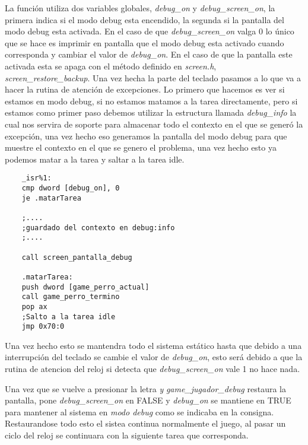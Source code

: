 La función utiliza dos variables globales, \textit{debug\_on} y \textit{debug\_screen\_on}, la primera indica si el modo debug esta encendido, la segunda si la pantalla del modo debug esta activada. En el caso de que \textit{debug\_screen\_on} valga 0 lo único que se hace es imprimir en pantalla que el modo debug esta activado cuando corresponda y cambiar el valor de \textit{debug\_on}. En el caso de que la pantalla este activada esta se apaga con el método definido en \textit{screen.h}, \textit{screen\_restore\_backup}. Una vez hecha la parte del teclado pasamos a lo que va a hacer la rutina de atención de excepciones. Lo primero que hacemos es ver si estamos en modo debug, si no estamos matamos a la tarea directamente, pero si estamos como primer paso debemos utilizar la estructura llamada \textit{debug\_info} la cual nos servira de soporte para almacenar todo el contexto en el que se generó la excepción, una vez hecho eso generamos la pantalla del modo debug para que muestre el contexto en el que se genero el problema, una vez hecho esto ya podemos matar a la tarea y saltar a la tarea idle.

\begin{lstlisting}
	_isr%1:
	cmp dword [debug_on], 0
	je .matarTarea
		
	;....
	;guardado del contexto en debug:info	
	;....	

	call screen_pantalla_debug

	.matarTarea:
	push dword [game_perro_actual]
	call game_perro_termino
	pop ax
	;Salto a la tarea idle
	jmp 0x70:0

\end{lstlisting}

Una vez hecho esto se mantendra todo el sistema estático hasta que debido a una interrupción del teclado se cambie el valor de \textit{debug\_on}, esto será debido a que la rutina de atencion del reloj si detecta que \textit{debug\_screen\_on} vale 1 no hace nada.

Una vez que se vuelve a presionar la letra \textit{y} \textit{game\_jugador\_debug} restaura la pantalla, pone \textit{debug\_screen\_on} en FALSE y \textit{debug\_on} se mantiene en TRUE para mantener al sistema en \textit{modo debug} como se indicaba en la consigna. Restaurandose todo esto el sistea continua normalmente el juego, al pasar un ciclo del reloj se continuara con la siguiente tarea que corresponda.
